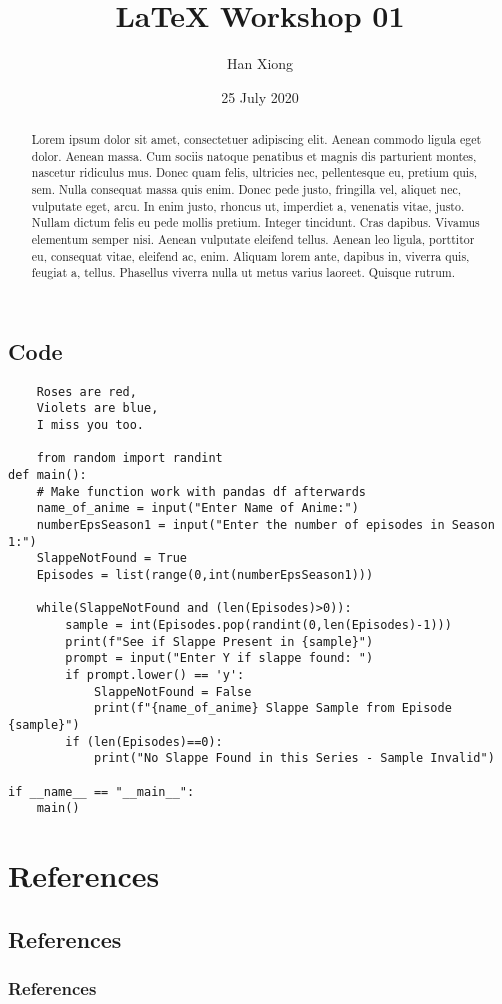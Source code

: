 \documentclass{elsarticle}
\title{LaTeX Workshop 01}
\author{Han Xiong}
\date{25 July 2020}
\begin{document}
\onecolumn
\maketitle
 \tableofcontents
 \listoffigures
 \listoftables
 \newpage
\begin{abstract}

    Lorem ipsum dolor sit amet, consectetuer adipiscing elit. Aenean commodo ligula eget dolor. Aenean massa. Cum sociis natoque penatibus et magnis dis parturient montes, nascetur ridiculus mus. Donec quam felis, ultricies nec, pellentesque eu, pretium quis, sem. Nulla consequat massa quis enim. Donec pede justo, fringilla vel, aliquet nec, vulputate eget, arcu. In enim justo, rhoncus ut, imperdiet a, venenatis vitae, justo. Nullam dictum felis eu pede mollis pretium. Integer tincidunt. Cras dapibus. Vivamus elementum semper nisi. Aenean vulputate eleifend tellus. Aenean leo ligula, porttitor eu, consequat vitae, eleifend ac, enim. Aliquam lorem ante, dapibus in, viverra quis, feugiat a, tellus. Phasellus viverra nulla ut metus varius laoreet. Quisque rutrum. 
    
    
\end{abstract}
%





\onecolumn





\subsection{Code}
\begin{verbatim}
    Roses are red,
    Violets are blue,
    I miss you too.
    
    from random import randint
def main():
    # Make function work with pandas df afterwards
    name_of_anime = input("Enter Name of Anime:")
    numberEpsSeason1 = input("Enter the number of episodes in Season 1:")
    SlappeNotFound = True 
    Episodes = list(range(0,int(numberEpsSeason1)))

    while(SlappeNotFound and (len(Episodes)>0)):
        sample = int(Episodes.pop(randint(0,len(Episodes)-1)))
        print(f"See if Slappe Present in {sample}")
        prompt = input("Enter Y if slappe found: ")
        if prompt.lower() == 'y':
            SlappeNotFound = False
            print(f"{name_of_anime} Slappe Sample from Episode {sample}")
        if (len(Episodes)==0):
            print("No Slappe Found in this Series - Sample Invalid")

if __name__ == "__main__":
    main()
\end{verbatim}



\section{References}
\subsection{References}
\subsubsection{References}
\printbibliography
\end{document}
